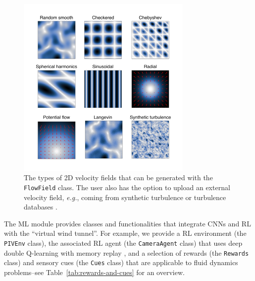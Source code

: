\documentclass[a4paper,fleqn]{cas-dc}
\begin{document}
\begin{figure}[t]
\centering
\includegraphics[width=8.5cm]{velocity-fields.pdf}
\caption{The types of 2D velocity fields that can be generated with the \texttt{FlowField} class. The user also has the option to upload an external velocity field, \textit{e.g.}, coming from synthetic turbulence \citep{saad2017scalable, richards2018fast} or turbulence databases \cite{perlman2007data}.}
\label{fig:velocity-fields}
\end{figure}

The ML module provides classes and functionalities that integrate CNNs and RL with the ``virtual wind tunnel''. For example, we provide a RL environment (the \texttt{PIVEnv} class), the associated RL agent (the \texttt{CameraAgent} class) that uses deep double Q-learning \cite{van2016deep} with memory replay \cite{liu2018effects}, and a selection of rewards (the \texttt{Rewards} class) and sensory cues (the \texttt{Cues} class) that are applicable to fluid dynamics problems--see Table~\ref{tab:rewards-and-cues} for an overview.
\end{document}
